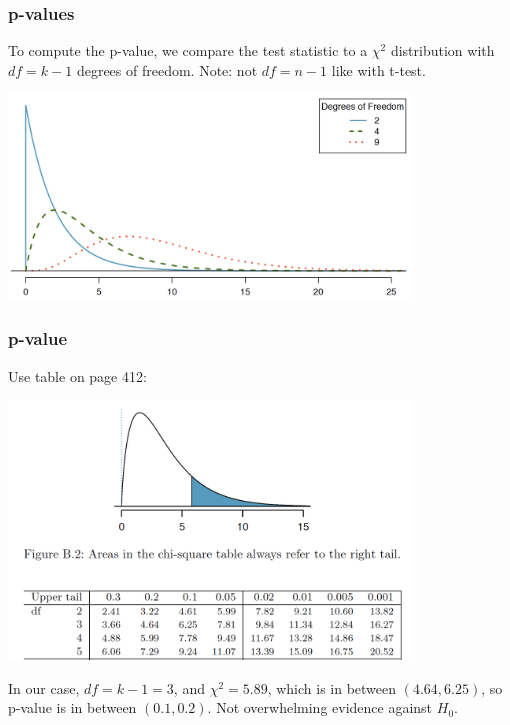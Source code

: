 \documentclass[handout]{beamer}
\begin{document}
\begin{frame}[fragile]
\frametitle{p-values}
To compute the p-value, we compare the test statistic to a $\chi^2$ distribution with $df=k-1$ degrees of freedom.  Note: not $df=n-1$ like with t-test.  

\vspace{0.25cm}

\begin{center}
\includegraphics[width=0.8\textwidth]{figure/chi.png}
\end{center}

\end{frame}


\begin{frame}[fragile]
\frametitle{p-value}
Use table on page 412:
\begin{center}
\includegraphics[width=0.8\textwidth]{figure/table.png}
\end{center}
\pause In our case, $df=k-1=3$, and $\chi^2=5.89$, which is in between $(4.64, 6.25)$, so p-value is in between $(0.1, 0.2)$.  Not overwhelming evidence against $H_0$.  

\end{frame}
\end{document}
